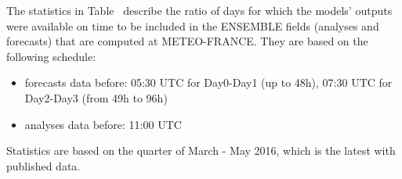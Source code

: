 \documentclass[9pt]{report}
\begin{document}
\noindent{}The statistics in Table~ describe the ratio of days for which the models' outputs were available on time to be included in the ENSEMBLE fields (analyses and forecasts) that are computed at METEO-FRANCE.
They are based on the following schedule:%

\begin{itemize}[noitemsep,topsep=\mdcompacttopsep]%

\item{}forecasts data before: 05:30 UTC for Day0-Day1 (up to 48h), 07:30 UTC for Day2-Day3 (from 49h to 96h)%

\item{}analyses data before: 11:00 UTC%
\end{itemize}%

\noindent{}Statistics are based on the quarter of March - May 2016, which is the latest with published data.%
\end{document}
